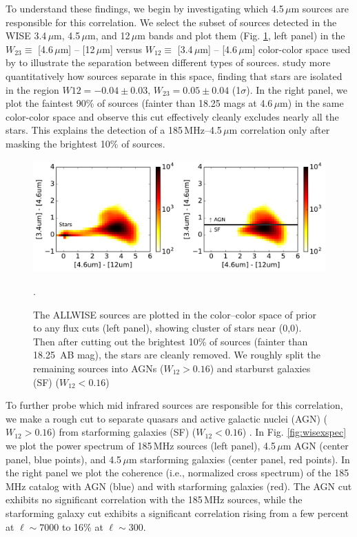 \documentclass[numberedappendix]{emulateapj}
\begin{document}
To understand these findings, we begin by investigating which 4.5\,$\mu$m sources are responsible for this correlation. We select the subset of sources detected in the WISE 3.4\,$\mu$m, 4.5\,$\mu$m, and 12\,$\mu$m bands and plot them (Fig. \ref{fig:wisecolorcolor}, left panel) in the $W_{23}\equiv$ [4.6\,$\mu$m] -- [12\,$\mu$m] versus $W_{12}\equiv$ [3.4\,$\mu$m] -- [4.6\,$\mu$m] color-color space used by \citet{Wright2010} to illustrate the separation between different types of sources. \citet{nikutta14} study more quantitatively how sources separate in this space, finding that stars are isolated in the region $W{12}=-0.04\pm0.03$, $W_{23}=0.05\pm0.04$ (1$\sigma$). In the right panel, we plot the faintest 90\% of sources (fainter than 18.25 mags at 4.6\,$\mu$m) in the same color-color space and observe this cut effectively cleanly excludes nearly all the stars. This explains the detection of a 185\,MHz--4.5\,$\mu$m correlation only after masking the brightest 10\% of sources. 

\begin{figure}[h]
\centering
\includegraphics[width=6in]{chap5_xcor/wise_color_color_figure_max=1e-3_5Jy.pdf}
\caption{The ALLWISE sources are plotted in the color--color space of \citet{Wright2010} prior to any flux cuts (left panel), showing cluster of stars near (0,0). Then after cutting out the brightest 10\% of sources (fainter than 18.25\, AB mag), the stars are cleanly removed. We roughly split the remaining sources into AGNs ($W_{12}>0.16$) and starburst galaxies (SF) ($W_{12}<0.16$) \citep{nikutta14,kurcz16}}.
\label{fig:wisecolorcolor}
\end{figure}

To further probe which mid infrared sources are responsible for this correlation, we make a rough cut to separate quasars and active galactic nuclei (AGN) ($W_{12}>0.16$) from starforming galaxies (SF) ($W_{12}<0.16$) \citep{nikutta14,kurcz16}. In Fig. \ref{fig:wisexspec} we plot the power spectrum of 185\,MHz sources (left panel), 4.5\,$\mu$m AGN (center panel, blue points), and 4.5\,$\mu$m starforming galaxies (center panel, red points). In the right panel we plot the coherence (i.e., normalized cross spectrum) of the 185\,MHz catalog with AGN (blue) and with starforming galaxies (red). The AGN cut exhibits no significant correlation with the 185\,MHz sources, while the starforming galaxy cut exhibits a significant correlation rising from a few percent at $\ell\sim7000$ to 16\% at $\ell\sim300$. 
\end{document}
